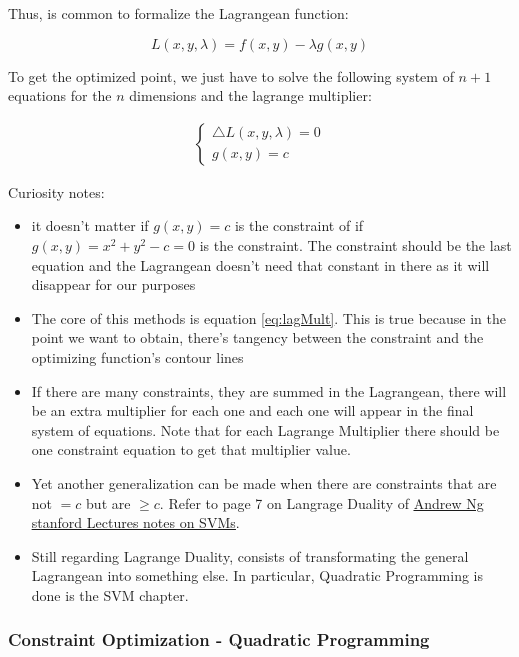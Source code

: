 Thus, is common to formalize the Lagrangean function:

\begin{equation}
    L(x,y,\lambda) = f(x,y) - \lambda g(x,y)
\end{equation}

To get the optimized point, we just have to solve the following system of $n+1$ equations for the $n$ dimensions and the lagrange multiplier:

\begin{gather}
    \begin{cases}
        \bigtriangleup L(x,y,\lambda) = 0 \\
        g(x,y) = c
    \end{cases}
\end{gather}


Curiosity notes:
\begin{itemize}
    \item it doesn't matter if $g(x,y) = c$ is the constraint of if $g(x,y) = x^2 + y^2 - c = 0$ is the constraint. The constraint should be the last equation and the Lagrangean doesn't need that constant in there as it will disappear for our purposes
    \item The core of this methods is equation \eqref{eq:lagMult}. This is true because in the point we want to obtain, there's tangency between the constraint and the optimizing function's contour lines
    \item If there are many constraints, they are summed in the Lagrangean, there will be an extra multiplier for each one and each one will appear in the final system of equations. Note that for each Lagrange Multiplier there should be one constraint equation to get that multiplier value.
    \item Yet another generalization can be made when there are constraints that are not $= c$ but are $\geq c$. Refer to page 7 on Langrage Duality of \href{http://cs229.stanford.edu/notes/cs229-notes3.pdf}{\ul{Andrew Ng stanford Lectures notes on SVMs}}.
    \item Still regarding Lagrange Duality, consists of transformating the general Lagrangean into something else. In particular, Quadratic Programming is done is the SVM chapter.
\end{itemize}
\subsubsection{Constraint Optimization - Quadratic Programming}
